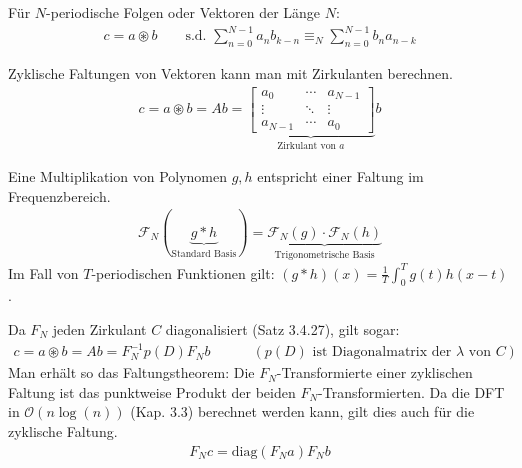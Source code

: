 
 Für $N$-periodische Folgen oder Vektoren der Länge $N$:
\begin{align*}
    c = a \circledast b\quad\quad \text{s.d. } \sum_{n = 0}^{N - 1} a_nb_{k - n} \equiv_N \sum_{n = 0}^{N - 1} b_n a_{n - k}
\end{align*}

\inlineremark Zyklische Faltungen von Vektoren kann man mit Zirkulanten berechnen. 
\begin{align*}
    c = a \circledast b = Ab = \underbrace{\begin{bmatrix}
        a_0 & \cdots & a_{N-1} \\
        \vdots & \ddots & \vdots \\
        a_{N-1} & \cdots & a_0
    \end{bmatrix}}_{\text{Zirkulant von } a}
    b
\end{align*}


\inlineremark Eine Multiplikation von Polynomen $g,h$ entspricht einer Faltung im Frequenzbereich.
\begin{align*}
    \mathcal{F}_N(\underbrace{g * h}_{\text{Standard Basis}}) = \underbrace{\mathcal{F}_N(g) \cdot \mathcal{F}_N(h)}_{\text{Trigonometrische Basis}}
\end{align*}
Im Fall von $T$-periodischen Funktionen gilt: $(g * h)(x) = \frac{1}{T}\displaystyle\int_{0}^{T}g(t)h(x-t)$.

\inlineremark Da $F_N$ jeden Zirkulant $C$ diagonalisiert (Satz 3.4.27), gilt sogar:
\begin{align*}
    c = a \circledast b = Ab = F_N^{-1}p(D)F_Nb \quad \quad \quad (p(D) \text{ ist Diagonalmatrix der } \lambda \text{ von } C )
\end{align*}
Man erhält so das Faltungstheorem: Die $F_N$-Transformierte einer zyklischen Faltung ist das punktweise Produkt der beiden $F_N$-Transformierten. Da die DFT in $\mathcal{O}(n\log(n))$ (Kap. 3.3) berechnet werden kann, gilt dies auch für die zyklische Faltung.
\begin{align*}
    F_Nc = \text{diag}(F_N a) F_N b
\end{align*}
